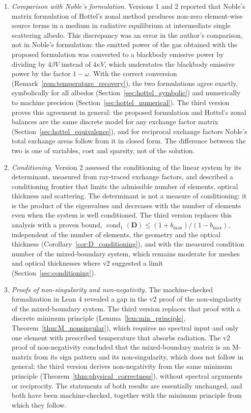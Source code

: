 \documentclass[preprint,1p,times]{elsarticle}
\theoremstyle{plain}
\theoremstyle{definition}
\theoremstyle{remark}
\begin{document}
\begin{enumerate}
\item \textit{Comparison with Noble's formulation.} Versions 1 and 2 reported that Noble's matrix formulation of Hottel's zonal method produces non-zero element-wise source terms in a medium in radiative equilibrium at intermediate single scattering albedo. This discrepancy was an error in the author's comparison, not in Noble's formulation: the emitted power of the gas obtained with the proposed formulation was converted to a blackbody emissive power by dividing by $4\beta V$ instead of $4\kappa V$, which understates the blackbody emissive power by the factor $1-\omega$. With the correct conversion (Remark~\ref{rem:temperature_recovery}), the two formulations agree exactly, symbolically for all albedos (Section~\ref{sec:hottel_symbolic}) and numerically to machine precision (Section~\ref{sec:hottel_numerical}). The third version proves this agreement in general: the proposed formulation and Hottel's zonal balances are the same discrete model for any exchange factor matrix (Section~\ref{sec:hottel_equivalence}), and for reciprocal exchange factors Noble's total exchange areas follow from it in closed form. The difference between the two is one of variables, cost and sparsity, not of the solution.

\item \textit{Conditioning.} Version 2 assessed the conditioning of the linear system by its determinant, measured from ray-traced exchange factors, and described a conditioning frontier that limits the admissible number of elements, optical thickness and scattering. The determinant is not a measure of conditioning: it is the product of the eigenvalues and decreases with the number of elements even when the system is well conditioned. The third version replaces this analysis with a proven bound, $\operatorname{cond}_1(\mathbf{D}) \leq (1+b_{\max})/(1-b_{\max})$, independent of the number of elements, the geometry and the optical thickness (Corollary~\ref{cor:D_conditioning}), and with the measured condition number of the mixed-boundary system, which remains moderate for meshes and optical thicknesses where v2 suggested a limit (Section~\ref{sec:conditioning}).

\item \textit{Proofs of non-singularity and non-negativity.} The machine-checked formalization in Lean 4 revealed a gap in the v2 proof of the non-singularity of the mixed-boundary system. The third version replaces that proof with a discrete minimum principle (Lemma~\ref{lem:min_principle}, Theorem~\ref{thm:M_nonsingular}), which requires no spectral input and only one element with prescribed temperature that absorbs radiation. The v2 proof of non-negativity concluded that the mixed-boundary matrix is an M-matrix from its sign pattern and its non-singularity, which does not follow in general; the third version derives non-negativity from the same minimum principle (Theorem~\ref{thm:physical_correctness}), without spectral arguments or reciprocity. The statements of both results are essentially unchanged, and both have been machine-checked, together with the minimum principle from which they follow.
\end{enumerate}
\end{document}
